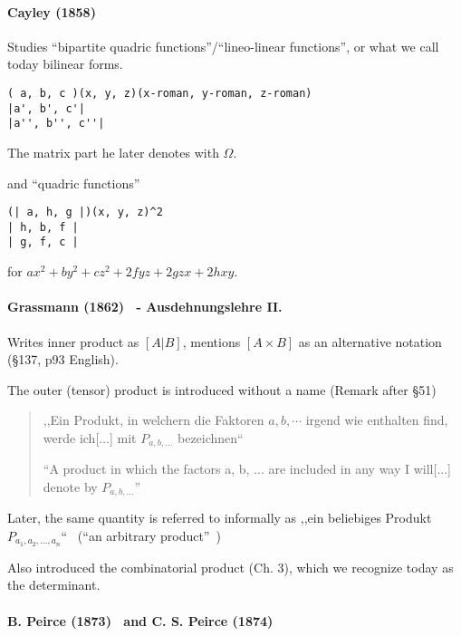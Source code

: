 \paragraph{Cayley (1858)~\cite{Cayley1858b}}

Studies ``bipartite quadric functions''/``lineo-linear functions'', or what we
call today bilinear forms.

\begin{verbatim}
( a, b, c )(x, y, z)(x-roman, y-roman, z-roman)
|a', b', c'|
|a'', b'', c''|
\end{verbatim}

The matrix part he later denotes with $\Omega$.

and ``quadric functions''

\begin{verbatim}
(| a, h, g |)(x, y, z)^2
| h, b, f |
| g, f, c |
\end{verbatim}

for $ax^2 + by^2 + cz^2 + 2fyz + 2gzx + 2hxy$.



\paragraph{Grassmann (1862)~\cite{Grassmann1862,Grassmann2000} - Ausdehnungslehre II.}

Writes inner product as $[A | B]$, mentions $[A \times B]$ as an alternative notation (\S 137, p93 English).

The outer (tensor) product is introduced without a name (Remark after \S 51)

\begin{quote}
,,Ein Produkt, in welchern die Faktoren $a, b, \cdots$ irgend wie enthalten find, werde ich[...] mit $P_{a,b,...}$ bezeichnen`` \cite[p. 24, \S 43]{Grassmann1862}

``A product in which the factors a, b, ... are included in any way I will[...] denote by $P_{a,b,...}$''~\cite[p. 22, \S 43]{Grassmann2000}
\end{quote}

Later, the same quantity is referred to informally as
,,ein beliebiges Produkt $P_{a_1, a_2, ..., a_n}$``~\cite[\S 353]{Grassmann1862} (``an arbitrary product''~\cite[p. 196, \S 353]{Grassmann2000})

Also introduced the combinatorial product (Ch. 3), which we recognize today as the determinant.


\paragraph{B. Peirce (1873)~\cite{Peirce1873} and C. S. Peirce (1874)~\cite{Peirce1874}}

